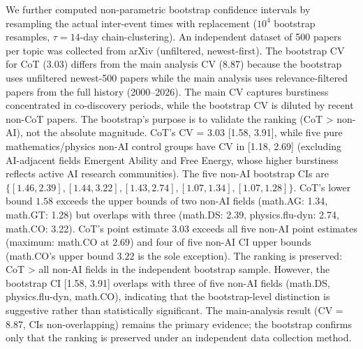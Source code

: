 \documentclass[12pt]{article}
\begin{document}
We further computed non-parametric bootstrap confidence intervals by resampling the actual inter-event times with replacement ($10^4$ bootstrap resamples, $\tau=14$-day chain-clustering). An independent dataset of 500 papers per topic was collected from arXiv (unfiltered, newest-first). The bootstrap CV for CoT (3.03) differs from the main analysis CV (8.87) because the bootstrap uses unfiltered newest-500 papers while the main analysis uses relevance-filtered papers from the full history (2000--2026). The main CV captures burstiness concentrated in co-discovery periods, while the bootstrap CV is diluted by recent non-CoT papers. The bootstrap's purpose is to validate the ranking (CoT > non-AI), not the absolute magnitude. CoT's CV = 3.03 [1.58, 3.91], while five pure mathematics/physics non-AI control groups have CV in [1.18, 2.69] (excluding AI-adjacent fields Emergent Ability and Free Energy, whose higher burstiness reflects active AI research communities). The five non-AI bootstrap CIs are $\{[1.46, 2.39], [1.44, 3.22], [1.43, 2.74], [1.07, 1.34], [1.07, 1.28]\}$. CoT's lower bound $1.58$ exceeds the upper bounds of two non-AI fields (math.AG: 1.34, math.GT: 1.28) but overlaps with three (math.DS: 2.39, physics.flu-dyn: 2.74, math.CO: 3.22). CoT's point estimate $3.03$ exceeds all five non-AI point estimates (maximum: math.CO at $2.69$) and four of five non-AI CI upper bounds (math.CO's upper bound $3.22$ is the sole exception). The ranking is preserved: CoT > all non-AI fields in the independent bootstrap sample. However, the bootstrap CI [1.58, 3.91] overlaps with three of five non-AI fields (math.DS, physics.flu-dyn, math.CO), indicating that the bootstrap-level distinction is suggestive rather than statistically significant. The main-analysis result (CV = 8.87, CIs non-overlapping) remains the primary evidence; the bootstrap confirms only that the ranking is preserved under an independent data collection method.
\end{document}
